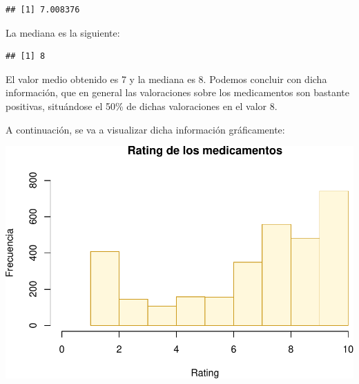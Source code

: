 \documentclass[spanish,]{article}
\newenvironment{Shaded}{\begin{snugshade}}{\end{snugshade}}
\newcommand{\KeywordTok}[1]{\textcolor[rgb]{0.13,0.29,0.53}{\textbf{#1}}}
\newcommand{\DataTypeTok}[1]{\textcolor[rgb]{0.13,0.29,0.53}{#1}}
\newcommand{\DecValTok}[1]{\textcolor[rgb]{0.00,0.00,0.81}{#1}}
\newcommand{\StringTok}[1]{\textcolor[rgb]{0.31,0.60,0.02}{#1}}
\newcommand{\CommentTok}[1]{\textcolor[rgb]{0.56,0.35,0.01}{\textit{#1}}}
\newcommand{\OperatorTok}[1]{\textcolor[rgb]{0.81,0.36,0.00}{\textbf{#1}}}
\newcommand{\NormalTok}[1]{#1}
\begin{document}
\begin{verbatim}
## [1] 7.008376
\end{verbatim}

La mediana es la siguiente:

\begin{Shaded}
\end{Shaded}

\begin{verbatim}
## [1] 8
\end{verbatim}

El valor medio obtenido es 7 y la mediana es 8. Podemos concluir con
dicha información, que en general las valoraciones sobre los
medicamentos son bastante positivas, situándose el 50\% de dichas
valoraciones en el valor 8.

A continuación, se va a visualizar dicha información gráficamente:

\begin{Shaded}
\end{Shaded}

\includegraphics{practica-original_files/figure-latex/unnamed-chunk-84-1.pdf}
\end{document}
